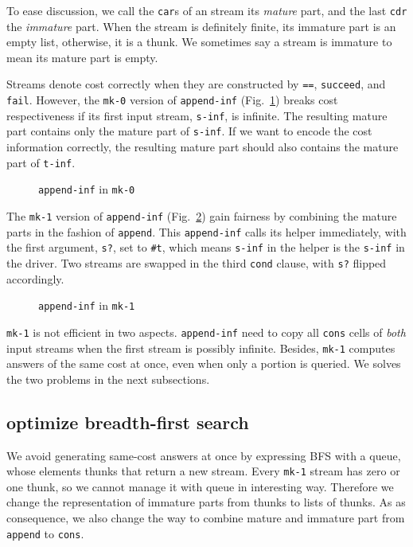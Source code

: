 \documentclass[format=acmlarge, review=true, authordraft=true]{acmart}
\begin{document}
To ease discussion, we call the \texttt{car}s of an stream its \emph{mature} 
part, and the last \texttt{cdr} the \emph{immature} part. When the stream is 
definitely finite, its immature part is an empty list, otherwise, it is a 
thunk. We sometimes say a stream is immature to mean its mature part is empty.

Streams denote cost correctly when they are constructed by \texttt{==}, 
\texttt{succeed}, and \texttt{fail}. However, the \texttt{mk-0} version of 
\texttt{append-inf} (Fig.~\ref{append-inf-0}) breaks cost respectiveness if its 
first input stream, \texttt{s-inf},  is infinite. The resulting mature part 
contains only the mature part of \texttt{s-inf}. If we want to encode the 
cost information correctly, the resulting mature part should also contains the 
mature part of \texttt{t-inf}.

\begin{figure}
	 	
	 \caption{\texttt{append-inf} in \texttt{mk-0}}
	 \label{append-inf-0}
\end{figure}

The \texttt{mk-1} version of \texttt{append-inf} (Fig.~\ref{append-inf-1}) 
gain fairness by combining the mature parts in the fashion of \texttt{append}. 
This \texttt{append-inf} calls its helper immediately, with the first argument, 
\texttt{s?}, set to \texttt{\#{}t}, which means \texttt{s-inf} in the helper is 
the \texttt{s-inf} in the driver. Two streams are swapped in the third 
\texttt{cond} clause, with \texttt{s?} flipped accordingly.

\begin{figure}
	 	
	 \caption{\texttt{append-inf} in \texttt{mk-1}}
	 \label{append-inf-1}
\end{figure}

\texttt{mk-1} is not efficient in two aspects. \texttt{append-inf} need to copy 
all \texttt{cons} cells of \emph{both} input streams when the first stream is 
possibly infinite. Besides, \texttt{mk-1} computes answers of the same cost
at once, even when only a portion is queried. We solves the two problems in the 
next subsections.

\subsection{optimize breadth-first search}

We avoid generating same-cost answers at once by expressing BFS with a queue, 
whose elements thunks that return a new stream. Every \texttt{mk-1} stream has 
zero or one thunk, so we cannot manage it with queue in interesting 
way. Therefore we change the representation of immature parts from thunks to 
lists of thunks. As as consequence, we also change the way to combine mature and 
immature part from \texttt{append} to \texttt{cons}. 
\end{document}
